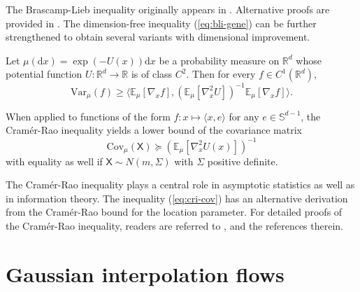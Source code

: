 \documentclass[twoside,11pt]{article}
\def\sR{{\mathbb{R}}}
\newcommand{\E}{\mathbb{E}}
\newcommand{\Var}{\mathrm{Var}}
\newcommand{\Cov}{\mathrm{Cov}}
\def\paref#1{(\ref{#1})}
\newcommand{\diff}{\mathrm{d}}
\numberwithin{equation}{section}
\begin{document}
 The Brascamp-Lieb inequality originally appears in \cite[Theorem 4.1]{brascamp1976extensions}.
 Alternative proofs are provided in \citet{bobkov2000brunn, bakry2014analysis, cordero2017transport}. The dimension-free inequality \paref{eq:bli-gene} can be further strengthened to obtain several variants with dimensional improvement.

\begin{lemma} 
    \label{lm:cri}
    Let $\mu(\diff x) = \exp(-U(x)) \diff x$ be a probability measure on $\sR^d$ whose potential function $U: \sR^d \to \sR$ is of class $C^2$.
    Then for every $f \in C^1(\sR^d)$,
    \begin{equation}
       \label{eq:cri-gene}
       \Var_{\mu} (f) \ge \langle \E_{\mu }[\nabla_x f], \left( \E_{\mu}[\nabla^2_x U] \right)^{-1} \E_{\mu}[\nabla_x f] \rangle.
    \end{equation}
\end{lemma}


When applied to functions of the form $f: x \mapsto \langle x, e \rangle$ for any $e \in \mathbb{S}^{d-1}$, the Cram{\'e}r-Rao inequality yields a lower bound of the covariance matrix
    \begin{equation}
        \label{eq:cri-cov}
        \Cov_{\mu} (\mathsf{X}) \succeq \left( \E_{\mu} [\nabla^2_x U(x)] \right)^{-1}
    \end{equation}
with equality as well if $\mathsf{X} \sim N(m, \Sigma)$ with $\Sigma$ positive definite.

The Cram{\'e}r-Rao inequality plays a central role in asymptotic statistics as well as in information theory. The inequality \paref{eq:cri-cov} has an alternative derivation from the Cram{\'e}r-Rao bound for the location parameter. For detailed proofs of the Cram{\'e}r-Rao inequality, readers are referred to \citet{chewi2022entropic, dai2023lipschitz}, and the references therein.


\section{Gaussian interpolation flows} \label{sec:gif}

\end{document}

